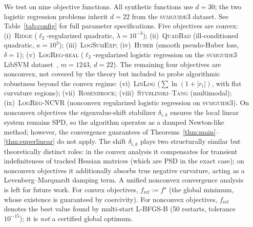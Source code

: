 \documentclass[review,onefignum,onetabnum]{siamart171218}
\begin{document}
	We test on nine objective functions.
	All synthetic functions use $d{=}30$; the two logistic regression problems
	inherit $d{=}22$ from the \textsc{svmguide3} dataset.
	See Table~\ref{tab:config} for full parameter specifications.
	Five objectives are convex:
	(i)~\textsc{Ridge} ($\ell_2$-regularized quadratic, $\lambda{=}10^{-3}$);
	(ii)~\textsc{QuadBad} (ill-conditioned quadratic, $\kappa{=}10^3$);
	(iii)~\textsc{LogSumExp};
	(iv)~\textsc{Huber} (smooth pseudo-Huber loss, $\delta{=}1$);
	(v)~\textsc{LogReg-real} ($\ell_2$-regularized logistic regression on the
	\textsc{svmguide3} LibSVM dataset~\citep{chang2011libsvm}, $m{=}1243$, $d{=}22$).
	The remaining four objectives are nonconvex, not covered by the theory but included
	to probe algorithmic robustness beyond the convex regime:
	(vi)~\textsc{LinLog} ($\sum\ln(1{+}|r_i|)$, with flat curvature regions);
	(vii)~\textsc{Rosenbrock};
	(viii)~\textsc{Styblinski--Tang} (multimodal);
	(ix)~\textsc{LogReg-NCVR} (nonconvex regularized logistic regression on
	\textsc{svmguide3}).
	On nonconvex objectives the eigenvalue-shift stabilizer $\delta_{i,k}$
	ensures the local linear system remains SPD, so the algorithm operates
	as a damped Newton-like method; however, the convergence
	guarantees of Theorems~\ref{thm:main}--\ref{thm:superlinear} do
	not apply.
	The shift $\delta_{i,k}$ plays two structurally similar but
	theoretically distinct roles:
	in the convex analysis it compensates for transient indefiniteness of
	tracked Hessian matrices (which are PSD in the exact case);
	on nonconvex objectives it additionally absorbs true negative
	curvature, acting as a Levenberg--Marquardt damping term.
	A unified nonconvex convergence analysis is left for future work.
	For convex objectives, $f_{\mathrm{ref}}:=f^\star$ (the global minimum,
	whose existence is guaranteed by coercivity).
	For nonconvex objectives, $f_{\mathrm{ref}}$ denotes the best value
	found by multi-start L-BFGS-B (50 restarts, tolerance $10^{-15}$);
	it is \emph{not} a certified global optimum.
	
\end{document}
